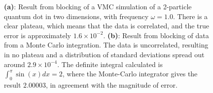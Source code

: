 		\begin{figure}[H]
			\begin{centering}
			\par\end{centering}

			\protect\caption{\textbf{(a)}: Result from blocking of a VMC simulation of a 2-particle quantum dot in two dimensions, with frequency $\omega = 1.0$. There is a clear plateau, which means that the data is correlated, and the true error is approximately $1.6\times 10^{-2}$. \textbf{(b)}: Result from blocking of data from a Monte Carlo integration. The data is uncorrelated, resulting in no plateau and a distribution of standard deviations spread out around $2.9\times 10^{-4}$. The definite integral calculated is $\int _{0}^{\pi} \sin (x)dx= 2$, where the Monte-Carlo integrator gives the result $2.00003$, in agreement with the magnitude of error. \label{fig:blocking_example}}
		\end{figure}




